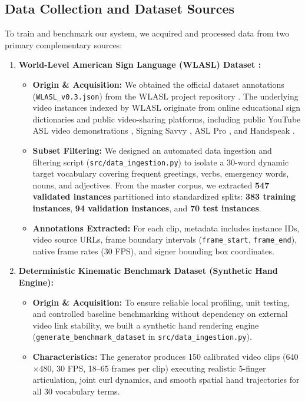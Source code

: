 \documentclass{article}
\begin{document}
\subsection*{Data Collection and Dataset Sources}
To train and benchmark our system, we acquired and processed data from two primary complementary sources:
\begin{enumerate}
    \item \textbf{World-Level American Sign Language (WLASL) Dataset \cite{li2020word}:}
    \begin{itemize}
        \item \textbf{Origin \& Acquisition:} We obtained the official dataset annotations (\texttt{WLASL\_v0.3.json}) from the WLASL project repository \cite{li2020word, wlasl_github}. The underlying video instances indexed by WLASL originate from online educational sign dictionaries and public video-sharing platforms, including public YouTube ASL video demonstrations \cite{youtube_asl}, Signing Savvy \cite{signingsavvy}, ASL Pro \cite{aslpro}, and Handspeak \cite{handspeak}.
        \item \textbf{Subset Filtering:} We designed an automated data ingestion and filtering script (\texttt{src/data\_ingestion.py}) to isolate a 30-word dynamic target vocabulary covering frequent greetings, verbs, emergency words, nouns, and adjectives. From the master corpus, we extracted \textbf{547 validated instances} partitioned into standardized splits: \textbf{383 training instances}, \textbf{94 validation instances}, and \textbf{70 test instances}.
        \item \textbf{Annotations Extracted:} For each clip, metadata includes instance IDs, video source URLs, frame boundary intervals (\texttt{frame\_start}, \texttt{frame\_end}), native frame rates (30 FPS), and signer bounding box coordinates.
    \end{itemize}

    \item \textbf{Deterministic Kinematic Benchmark Dataset (Synthetic Hand Engine):}
    \begin{itemize}
        \item \textbf{Origin \& Acquisition:} To ensure reliable local profiling, unit testing, and controlled baseline benchmarking without dependency on external video link stability, we built a synthetic hand rendering engine (\texttt{generate\_benchmark\_dataset} in \texttt{src/data\_ingestion.py}).
        \item \textbf{Characteristics:} The generator produces 150 calibrated video clips (640$\times$480, 30 FPS, 18--65 frames per clip) executing realistic 5-finger articulation, joint curl dynamics, and smooth spatial hand trajectories for all 30 vocabulary terms.
    \end{itemize}


\end{enumerate}
\end{document}
